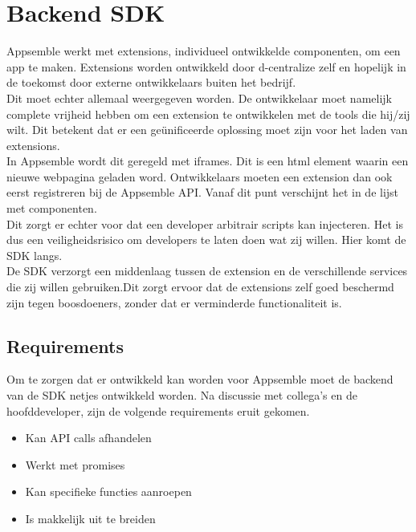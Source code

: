 \chapter{Backend SDK}

Appsemble werkt met extensions, individueel ontwikkelde componenten, om een app te maken. Extensions worden ontwikkeld door d-centralize zelf en hopelijk in de toekomst door externe ontwikkelaars buiten het bedrijf. \\

Dit moet echter allemaal weergegeven worden. De ontwikkelaar moet namelijk complete vrijheid hebben om een extension te ontwikkelen met de tools die hij/zij wilt. Dit betekent dat er een ge{\"u}nificeerde oplossing moet zijn voor het laden van extensions. \\ 

In Appsemble wordt dit geregeld met iframes. Dit is een html element waarin een nieuwe webpagina geladen word. Ontwikkelaars moeten een extension dan ook eerst registreren bij de Appsemble API. Vanaf dit punt verschijnt het in de lijst met componenten. \\

Dit zorgt er echter voor dat een developer arbitrair scripts kan injecteren. Het is dus een veiligheidsrisico om developers te laten doen wat zij willen. Hier komt de SDK langs. \\

De SDK verzorgt een middenlaag tussen de extension en de verschillende services die zij willen gebruiken.Dit zorgt ervoor dat de extensions zelf goed beschermd zijn tegen boosdoeners, zonder dat er verminderde functionaliteit is.

\section{Requirements}

Om te zorgen dat er ontwikkeld kan worden voor Appsemble moet de backend van de SDK netjes ontwikkeld worden. Na discussie met collega's en de hoofddeveloper, zijn de volgende requirements eruit gekomen.

\begin{itemize}
	\item Kan API calls afhandelen
	\item Werkt met promises
	\item Kan specifieke functies aanroepen
	\item Is makkelijk uit te breiden
\end{itemize}

